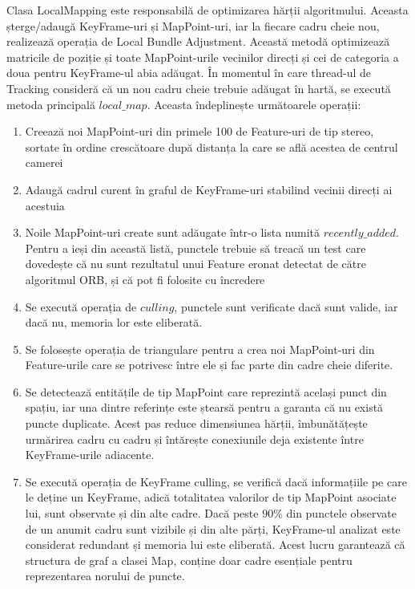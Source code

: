 \documentclass[12pt,a4paper]{report}
\begin{document}
Clasa LocalMapping este responsabilă de optimizarea hărții algoritmului. Aceasta șterge/adaugă KeyFrame-uri
și MapPoint-uri, iar la fiecare cadru cheie nou, realizează operația de Local Bundle 
Adjustment. Această metodă optimizează matricile de poziție și toate MapPoint-urile vecinilor 
direcți și cei de categoria a doua pentru KeyFrame-ul abia adăugat. În momentul în care 
thread-ul de Tracking consideră că un nou cadru cheie trebuie adăugat în hartă, se execută
metoda principală $ local\_map $. Aceasta îndeplinește următoarele operații:
\begin{enumerate}
    \item Creează noi MapPoint-uri din primele 100 de Feature-uri de tip stereo, 
sortate în ordine crescătoare după distanța la care se află acestea de centrul camerei  
    \item Adaugă cadrul curent în graful de KeyFrame-uri stabilind vecinii direcți ai
acestuia 
    \item Noile MapPoint-uri create sunt adăugate într-o lista numită $ recently\_added $.
Pentru a ieși din această listă, punctele trebuie să treacă un test care dovedește că 
nu sunt rezultatul unui Feature eronat detectat de către algoritmul ORB, și că pot fi 
folosite cu încredere
    \item Se execută operația de $ culling $, punctele sunt verificate dacă sunt valide, iar
dacă nu, memoria lor este eliberată.
    \item Se folosește operația de triangulare pentru a crea noi MapPoint-uri din 
Feature-urile care se potrivesc între ele și fac parte din cadre cheie diferite.
    \item Se detectează entitățile de tip MapPoint care reprezintă același punct
din spațiu, iar una dintre referințe este ștearsă pentru a garanta că nu există puncte duplicate. 
Acest pas reduce dimensiunea hărții, îmbunătățește urmărirea cadru cu cadru și întărește conexiunile
deja existente între KeyFrame-urile adiacente.    
    \item Se execută operația de KeyFrame culling, se verifică dacă informațiile pe 
care le deține un KeyFrame, adică totalitatea valorilor de tip MapPoint asociate lui, sunt observate
și din alte cadre. Dacă peste 90\% din punctele observate de un anumit cadru sunt vizibile și din 
alte părți, KeyFrame-ul analizat este considerat redundant și memoria lui este eliberată. Acest
lucru garantează că structura de graf a clasei Map, conține doar cadre esențiale pentru reprezentarea
norului de puncte. 
\end{enumerate}
\end{document}
